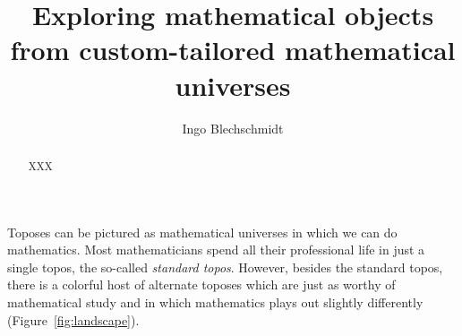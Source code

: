 \documentclass[oneside,reqno]{amsart}
\title[]{Exploring mathematical objects from custom-tailored mathematical universes}
\author{Ingo Blechschmidt}
\theoremstyle{definition}
\theoremstyle{plain}
\theoremstyle{remark}
\renewcommand{\_}{\mathpunct{.}\,}
\newcommand{\?}{\,{:}\,}
\begin{document}
\begin{abstract}
  XXX
\end{abstract}

\maketitle
\thispagestyle{empty}

\tableofcontents

\noindent
Toposes can be pictured as mathematical universes in which we can do
mathematics. Most mathematicians spend all their professional life in just a
single topos, the so-called \emph{standard topos}. However, besides the
standard topos, there is a colorful host of alternate toposes which are just as
worthy of mathematical study and in which mathematics plays out slightly
differently (Figure~\ref{fig:landscape}).
\end{document}
